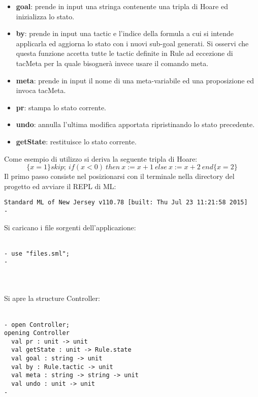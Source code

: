 \documentclass[]{article}
\begin{document}
\begin{itemize}
	\item \textbf{goal}: prende in input una stringa contenente una tripla di Hoare ed inizializza lo stato.
	\item \textbf{by}: prende in input una tactic e l'indice della formula a cui si intende applicarla ed aggiorna lo stato con i nuovi sub-goal generati. Si osservi che questa funzione accetta tutte le tactic definite in Rule ad eccezione di tacMeta per la quale bisogner\`a invece usare il comando meta.
	\item \textbf{meta}: prende in input il nome di una meta-variabile ed una proposizione ed invoca tacMeta.
	\item \textbf{pr}: stampa lo stato corrente.
    \item \textbf{undo}: annulla l'ultima modifica apportata ripristinando lo stato  precedente.
    \item \textbf{getState}: restituisce lo stato corrente. 
\end{itemize}
Come esempio di utilizzo si deriva la seguente tripla di Hoare:
\begin{equation*}
	\{x=1\} skip; \ if(x < 0) \ then\  x:=x+1 \ else \ x:=x+2 \ end \{x = 2\}
\end{equation*} 
Il primo passo consiste nel posizionarsi con il terminale nella directory del progetto ed avviare il REPL di ML:
\begin{center}
\begin{BVerbatim}
Standard ML of New Jersey v110.78 [built: Thu Jul 23 11:21:58 2015]
- 
\end{BVerbatim}
\end{center}
Si caricano i file sorgenti dell'applicazione:
\\
\\
\begin{BVerbatim}
- use "files.sml";
-
\end{BVerbatim}
\\
\\
Si apre la structure Controller:
\\
\\
\begin{BVerbatim}
- open Controller;
opening Controller
  val pr : unit -> unit
  val getState : unit -> Rule.state
  val goal : string -> unit
  val by : Rule.tactic -> unit
  val meta : string -> string -> unit
  val undo : unit -> unit
-
\end{BVerbatim}
\\
\\
\end{document}
